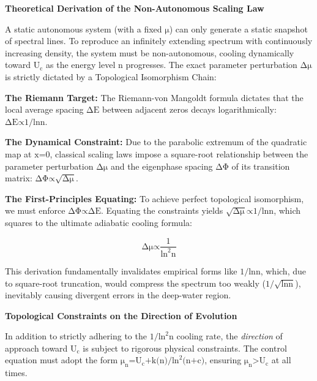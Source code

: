 \textbf{Theoretical Derivation of the Non-Autonomous Scaling Law}

A static autonomous system (with a fixed \(\text{μ}\)) can only generate
a static snapshot of spectral lines. To reproduce an infinitely
extending spectrum with continuously increasing density, the system must
be non-autonomous, cooling dynamically toward \(\text{U}_{\text{c}}\) as
the energy level \(\text{n}\) progresses. The exact parameter
perturbation \(\text{Δ}\text{μ}\) is strictly dictated by a Topological
Isomorphism Chain:

\textbf{The Riemann Target:} The Riemann-von Mangoldt formula dictates
that the local average spacing \(\text{Δ}\text{E}\) between adjacent
zeros decays logarithmically: \(\text{Δ}\text{E}\text{∝1/ln}\text{n}\).

\textbf{The Dynamical Constraint:} Due to the parabolic extremum of the
quadratic map at \(\text{x}\text{=0}\), classical scaling laws impose a
square-root relationship between the parameter perturbation
\(\text{Δ}\text{μ}\) and the eigenphase spacing \(\text{ΔΦ}\) of its
transition matrix: \(\text{ΔΦ∝}\sqrt{\text{Δ}\text{μ}}\).

\textbf{The First-Principles Equating:} To achieve perfect topological
isomorphism, we must enforce \(\text{ΔΦ∝Δ}\text{E}\). Equating the
constraints yields \(\sqrt{\text{Δ}\text{μ}}\text{∝1/ln}\text{n}\),
which squares to the ultimate adiabatic cooling formula:

\[\text{Δ}\text{μ}\text{∝}\frac{\text{1}}{\text{ln}^{\text{2}}\text{n}}\]

This derivation fundamentally invalidates empirical forms like
\(\text{1/ln}\text{n}\), which, due to square-root truncation, would
compress the spectrum too weakly
(\(\text{1/}\sqrt{\text{ln}\text{n}}\)), inevitably causing divergent
errors in the deep-water region.

\textbf{Topological Constraints on the Direction of Evolution}

In addition to strictly adhering to the
\(\text{1/}\text{ln}^{\text{2}}\text{n}\) cooling rate, the
\emph{direction} of approach toward \(\text{U}_{\text{c}}\) is subject
to rigorous physical constraints. The control equation must adopt the
form
\(\text{μ}_{\text{n}}\text{=}\text{U}_{\text{c}}\text{+}\text{k}\text{(}\text{n}\text{)/}\text{ln}^{\text{2}}\text{(}\text{n}\text{+}\text{c}\text{)}\),
ensuring \(\text{μ}_{\text{n}}\text{>}\text{U}_{\text{c}}\) at all
times.

